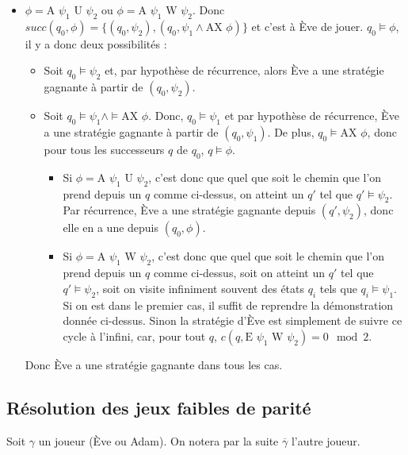 \documentclass[10pt,a4paper]{article}
\begin{document}
\begin{itemize}
\item $\phi = \mbox{A } \psi_1 \mbox{ U } \psi_2$ ou $\phi = \mbox{A } \psi_1 \mbox{ W } \psi_2$. Donc $succ(q_0,\phi) = \{ (q_0,\psi_2), (q_0,\psi_1 \land \mbox{AX } \phi) \}$ et c'est à Ève de jouer. $q_0 \vDash \phi$, il y a donc deux possibilités :
\begin{itemize}
	\item Soit $q_0 \vDash \psi_2$ et, par hypothèse de récurrence, alors Ève a une stratégie gagnante à partir de $(q_0,\psi_2)$.
	\item Soit $q_0 \vDash \psi_1 \land \vDash \mbox{AX } \phi$. Donc, $q_0 \vDash \psi_1$ et par hypothèse de récurrence, Ève a une stratégie gagnante à partir de $(q_0,\psi_1)$. De plus, $q_0 \vDash \mbox{AX } \phi$, donc pour tous les successeurs $q$ de $q_0$, $q \vDash \phi$.
	\begin{itemize}
	\item Si $\phi = \mbox{A } \psi_1 \mbox{ U } \psi_2$, c'est donc que quel que soit le chemin que l'on prend depuis un $q$ comme ci-dessus, on atteint un $q'$ tel que $q' \vDash \psi_2$. Par récurrence, Ève a une stratégie gagnante depuis $(q', \psi_2)$, donc elle en a une depuis $(q_0,\phi)$.
	\item Si $\phi = \mbox{A } \psi_1 \mbox{ W } \psi_2$, c'est donc que quel que soit le chemin que l'on prend depuis un $q$ comme ci-dessus, soit on atteint un $q'$ tel que $q' \vDash \psi_2$, soit on visite infiniment souvent des états $q_i$ tels que $q_i \vDash \psi_1$. Si on est dans le premier cas, il suffit de reprendre la démonstration donnée ci-dessus. Sinon la stratégie d'Ève est simplement de suivre ce cycle à l'infini, car, pour tout $q$, $c(q,\mbox{E } \psi_1 \mbox{ W } \psi_2) = 0 \mod 2$.
	\end{itemize}
\end{itemize}
Donc Ève a une stratégie gagnante dans tous les cas.
\end{itemize}

\subsection{Résolution des jeux faibles de parité}
\label{algofpg}
Soit $\gamma$ un joueur (Ève ou Adam). On notera par la suite $\overline{\gamma}$ l'autre joueur.
\end{document}
